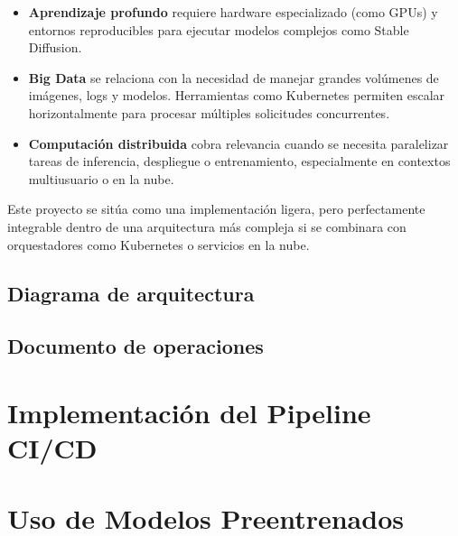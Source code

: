\documentclass{article}
\begin{document}
\begin{itemize}
  \item \textbf{Aprendizaje profundo} requiere hardware especializado (como GPUs) y entornos reproducibles para ejecutar modelos complejos como Stable Diffusion.

  \item \textbf{Big Data} se relaciona con la necesidad de manejar grandes volúmenes de imágenes, logs y modelos. Herramientas como Kubernetes permiten escalar horizontalmente para procesar múltiples solicitudes concurrentes.

  \item \textbf{Computación distribuida} cobra relevancia cuando se necesita paralelizar tareas de inferencia, despliegue o entrenamiento, especialmente en contextos multiusuario o en la nube.
\end{itemize}

Este proyecto se sitúa como una implementación ligera, pero perfectamente integrable dentro de una arquitectura más compleja si se combinara con orquestadores como Kubernetes o servicios en la nube.

\subsection{Diagrama de arquitectura}
\subsection{Documento de operaciones}


\section{Implementación del Pipeline CI/CD}


\section{Uso de Modelos Preentrenados}

\newpage


\end{document}
